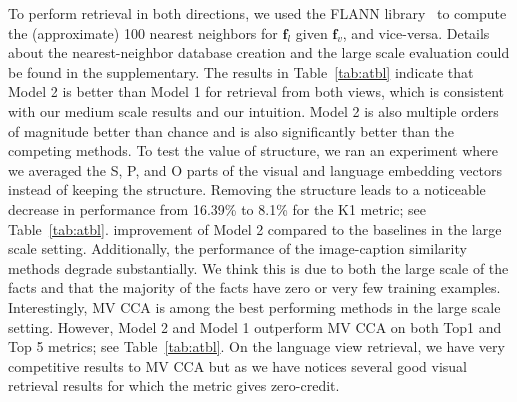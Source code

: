 \documentclass[runningheads]{llncs}
\begin{document}
To  perform retrieval in both directions, we used the FLANN library~\cite{muja2009flann}%
to compute the (approximate) 100 nearest neighbors for $\mathbf{f}_l$ given $\mathbf{f}_v$, and vice-versa.  Details about the nearest-neighbor database creation and the large scale evaluation could be found in the supplementary. 
The results in Table~\ref{tab:atbl} indicate that Model 2 is better than Model 1 for retrieval from  both views, which is consistent with our medium scale results and our intuition. Model 2 is also multiple orders of magnitude better than chance and is also significantly better than the competing methods. To test the value of structure, we ran an experiment where we averaged the S, P, and O parts of the visual and language embedding vectors instead of keeping the structure. 
Removing the structure leads to a noticeable decrease in performance from 16.39\% to 8.1\% for the K1 metric; see Table~\ref{tab:atbl}.
improvement of Model 2 compared to the baselines in the large scale setting. Additionally, the performance of the image-caption similarity methods degrade substantially. We think this is due to both the large scale of the facts and that the majority of the facts have zero or very few training examples. Interestingly, MV CCA is among the best performing methods in the large scale setting. However, Model 2 and Model 1 outperform MV CCA on both Top1 and Top 5 metrics; see Table~\ref{tab:atbl}. On the language view retrieval, we have very competitive results to MV CCA but as we have notices several good visual retrieval results for which the metric gives zero-credit.   
\end{document}
